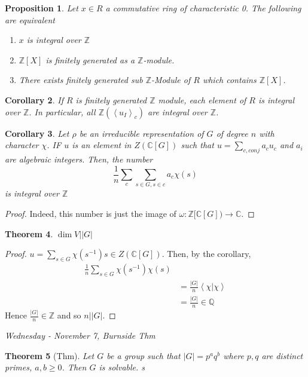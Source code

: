 \documentclass[letterpaper, leqno, 12pt]{article}
\newcommand{\bZ}{\mathbb{Z}}
\newcommand{\bQ}{\mathbb{Q}}
\providecommand{\ip}[1]{\left\langle #1 \right\rangle}
\newcommand{\bC} {\mathbb{C}}
\theoremstyle{stdthm}
\newtheorem{thm}{Theorem}
\newtheorem{cor}[thm]{Corollary}
\newtheorem{prop}[thm]{Proposition}
\theoremstyle{stddef}
\theoremstyle{stdnonum}
\theoremstyle{stdqands}
\theoremstyle{stdbold}
\begin{document}
\begin{prop}
Let $x \in R$ a commutative ring of characteristic 0. The following are equivalent
\begin{enumerate}
\item $x$ is integral over $\bZ$
\item $\bZ[X]$ is finitely generated as a $\bZ$-module. 
\item There exists finitely generated sub $\bZ$-Module of $R$ which contains $\bZ[X]$. 
\end{enumerate}
\end{prop}

\begin{cor}
If $R$ is finitely generated $\bZ$ module, each element of $R$ is integral over $\bZ$. In particular, all $\bZ(\ip{u_I}_c)$ are integral over $\bZ$. 
\end{cor}

\begin{cor}
Let $\rho$ be an irreducible representation of $G$ of degree $n$ with character $\chi$. IF $u$ is an element in $Z(\bC[G])$ such that $ u = \sum_{c , conj} a_c u_c$ and $a_i$ are algebraic integers. Then, the number 
\[ \frac{1}{n} \sum_c \sum_{s\in G, s \in c} a_c \chi(s) \]
is integral over $\bZ$
\end{cor}

\begin{proof}
Indeed, this number is just the image of $\omega: \bZ[\bC[G]) \rightarrow \bC$. 
\end{proof}

\begin{thm}
$\dim V ||G|$
\end{thm}

\begin{proof}
$ u = \sum_{s\in G} \chi(s^{-1}) s \in Z(\bC[G])$. Then, by the corollary,
\begin{align*}
\frac{1}{n}\sum_{s\in G} \chi(s^{-1}) \chi(s)\\
&= \frac{|G|}{n} \ip{\chi|\chi}\\
&= \frac{|G|}{n} \in \bQ
\end{align*}
Hence $\frac{|G|}{n} \in \bZ$ and so $n||G|$. 
\end{proof}


\begin{center}
\emph{Wednesday - November 7, Burnside Thm}
\end{center}

\begin{thm} [Thm]
Let $G$ be a group such that $|G|=p^a q^b$ where $p,q$ are distinct primes, $a,b \geq 0$. Then $G$ is solvable. s
\end{thm}
\end{document}
